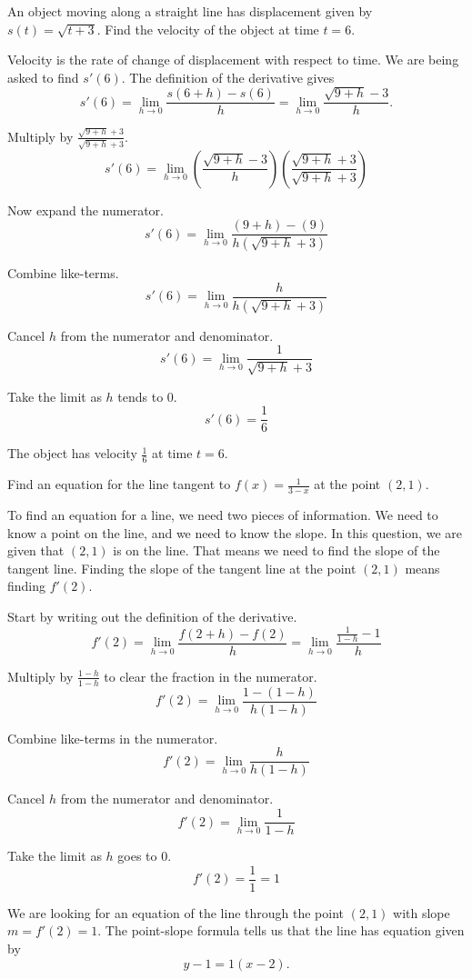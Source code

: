 \documentclass{ximera}
\begin{document}
\begin{example}
	An object moving along a straight line has displacement given by $s(t) = \sqrt{t+3}$.  Find the velocity of the
	object at time $t=6$.
	\begin{explanation}
		Velocity is the rate of change of displacement with respect to time.  We are being asked to
		find $s'(6)$.
		The definition of the derivative gives
		\[ s'(6) = \lim_{h \to 0} \frac{s(6+h)-s(6)}{h} = \lim_{h\to 0} \frac{\sqrt{9+h}-3}{h}. \]
		
		Multiply by $\frac{\sqrt{9+h}+3}{\sqrt{9+h}+3}$.
		\[ s'(6) = \lim_{h\to 0} \left(\frac{\sqrt{9+h}-3}{h} \right)\left( \frac{\sqrt{9+h}+3}{\sqrt{9+h}+3} \right) \]		
		
		Now expand the numerator.		
		\[ s'(6) = \lim_{h \to 0} \frac{(9+h) - (9)}{h\left(\sqrt{9+h}+3 \right)} \]

		Combine like-terms.
		\[ s'(6) = \lim_{h \to 0} \frac{h}{h\left(\sqrt{9+h}+3\right)} \]

		Cancel $h$ from the numerator and denominator.
		\[ s'(6) = \lim_{h\to 0} \frac{1}{\sqrt{9+h}+3} \]

		Take the limit as $h$ tends to $0$.
		\[ s'(6) = \frac{1}{6} \]
	
		The object has velocity $\frac{1}{6}$ at time $t=6$.
	\end{explanation}
\end{example}




\begin{example}
	Find an equation for the line tangent to $f(x) = \frac{1}{3-x}$ at the point $(2, 1)$.
	\begin{explanation}
		To find an equation for a line, we need two pieces of information.  We need to know
		a point on the line, and we need to know the slope.  In this question, we are given
		that $(2,1)$ is on the line.  That means we need to find the slope of the tangent line.
		Finding the slope of the tangent line at the point $(2,1)$ means finding $f'(2)$.
		
		Start by writing out the definition of the derivative.
		\[ f'(2) = \lim_{h\to 0} \frac{f(2+h)-f(2)}{h} = \lim_{h\to 0} \frac{\frac{1}{1-h} - 1}{h} \]

		Multiply by $\frac{1-h}{1-h}$ to clear the fraction in the numerator.
		\[ f'(2) = \lim_{h\to 0} \frac{1 - (1-h)}{h(1-h)} \]

		Combine like-terms in the numerator.
		\[ f'(2) = \lim_{h\to 0} \frac{h}{h(1-h)} \]

		Cancel $h$ from the numerator and denominator.
		\[ f'(2) = \lim_{h\to 0} \frac{1}{1-h} \]
		
		Take the limit as $h$ goes to $0$. 
		\[ f'(2) = \frac{1}{1} = 1 \]

		We are looking for an equation of the line through the point $(2,1)$ with slope $m = f'(2) = 1$.
		The point-slope formula tells us that the line has equation given by
		\[ y-1 = 1(x-2). \]	
	\end{explanation}
\end{example}
\end{document}
